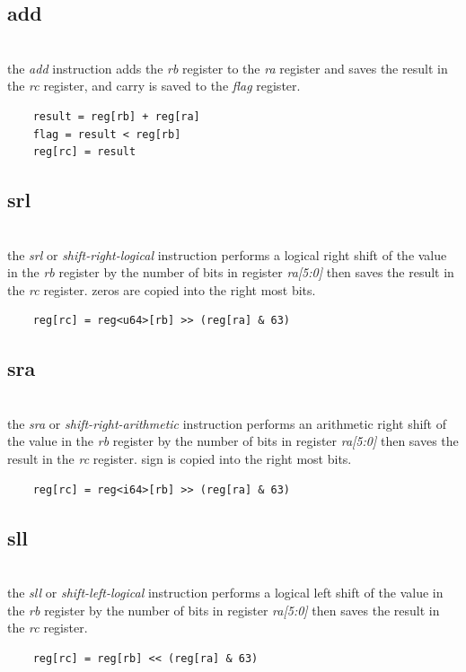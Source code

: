 \subsection{add}
\\
the \emph{add} instruction adds the \emph{rb} register to
the \emph{ra} register and saves the result in the \emph{rc} register,
and carry is saved to the \emph{flag} register.
\begin{Verbatim}
    result = reg[rb] + reg[ra]
    flag = result < reg[rb]
    reg[rc] = result
\end{Verbatim}

\subsection{srl}
\\
the \emph{srl} or \emph{shift-right-logical} instruction performs a
logical right shift of the value in the \emph{rb} register by the
number of bits in register \emph{ra[5:0]} then saves the result in the
\emph{rc} register.
zeros are copied into the right most bits.
\begin{Verbatim}
    reg[rc] = reg<u64>[rb] >> (reg[ra] & 63)
\end{Verbatim}

\subsection{sra}
\\
the \emph{sra} or \emph{shift-right-arithmetic} instruction performs an
arithmetic right shift of the value in the \emph{rb} register by the
number of bits in register \emph{ra[5:0]} then saves the result in the
\emph{rc} register. sign is copied into the right most bits.
\begin{Verbatim}
    reg[rc] = reg<i64>[rb] >> (reg[ra] & 63)
\end{Verbatim}

\subsection{sll}
\\
the \emph{sll} or \emph{shift-left-logical} instruction performs a
logical left shift of the value in the \emph{rb} register by the
number of bits in register \emph{ra[5:0]} then saves the result in the
\emph{rc} register.
\begin{Verbatim}
    reg[rc] = reg[rb] << (reg[ra] & 63)
\end{Verbatim}

